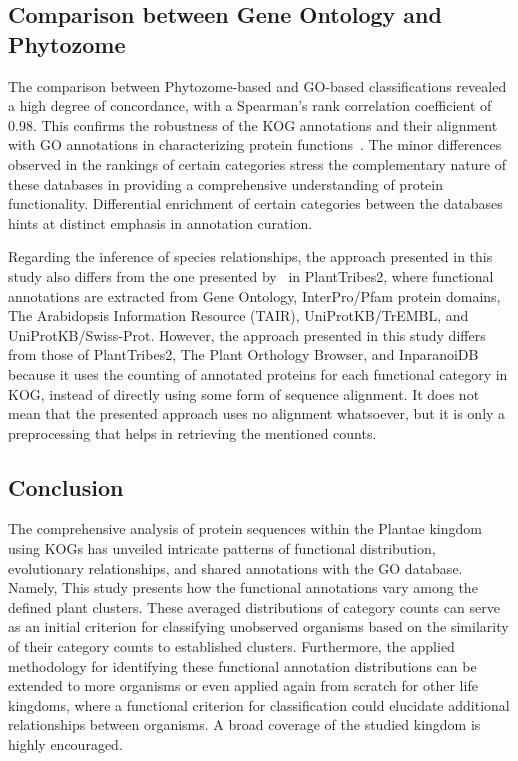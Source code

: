 \subsection{Comparison between Gene Ontology and Phytozome}
\label{sec:conclusion.comparison}

The comparison between Phytozome-based and GO-based 
classifications revealed a high degree of concordance, 
with a Spearman's rank correlation coefficient of 0.98. 
This confirms the robustness of the KOG annotations and 
their alignment with GO annotations in characterizing 
protein functions~\citep{tatusov2003}. 
The minor differences observed in the 
rankings of certain categories stress the complementary 
nature of these databases in providing a comprehensive 
understanding of protein functionality. Differential 
enrichment of certain categories between the databases 
hints at distinct emphasis in annotation curation.

Regarding the inference of species relationships, the 
approach presented in this study also differs from the one 
presented by~\cite{wafula2023} in PlantTribes2, where 
functional annotations are extracted from Gene Ontology, 
InterPro/Pfam protein domains, The Arabidopsis Information 
Resource (TAIR), UniProtKB/TrEMBL, and UniProtKB/Swiss-Prot.
However, the approach presented in this study differs from 
those of PlantTribes2, The Plant Orthology Browser, and 
InparanoiDB because it uses the counting of annotated proteins 
for each functional category in KOG, instead of directly using 
some form of sequence alignment. It does not mean that the 
presented approach uses no alignment whatsoever, but it is only 
a preprocessing that helps in retrieving the mentioned counts.



\subsection{Conclusion}
\label{sec:conclusion.conclusion}

The comprehensive analysis of protein 
sequences within the Plantae kingdom using KOGs has 
unveiled intricate patterns of functional distribution, 
evolutionary relationships, and shared annotations with 
the GO database. Namely, This study presents 
how the functional annotations vary among the defined plant 
clusters. These averaged distributions of category counts 
can serve as an initial criterion for classifying unobserved 
organisms based on the similarity of their category counts to 
established clusters. Furthermore, the applied methodology 
for identifying these functional annotation distributions 
can be extended to more organisms or even applied again 
from scratch for other life kingdoms, where a 
functional criterion for classification could elucidate 
additional relationships between organisms. A broad coverage of 
the studied kingdom is highly encouraged.

